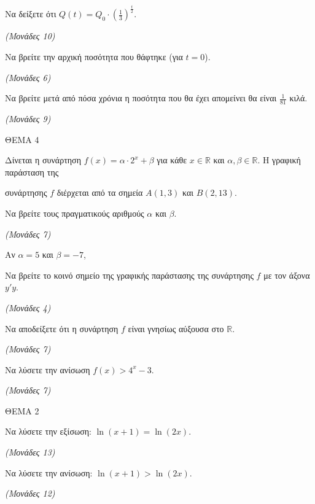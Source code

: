 \documentclass[11pt,a4paper,twoside]{book}
\newcommand{\monades}[1]{\hfill \textit{(Μονάδες #1)}}
\begin{document}
\begin{alist}
\item Να δείξετε ότι $Q(t) = Q_0 \cdot \left(\frac{1}{3}\right)^{\frac{t}{2}}$.

\monades{10}

\item Να βρείτε την αρχική ποσότητα που θάφτηκε (για $t=0$).

\monades{6}

\item Να βρείτε μετά από πόσα χρόνια η ποσότητα που θα έχει απομείνει θα είναι $\frac{1}{81}$ κιλά.

\monades{9}
\end{alist}

\vspace{4mm}

ΘΕΜΑ 4

Δίνεται η συνάρτηση $f(x) = \alpha \cdot 2^x + \beta$ για κάθε $x \in \mathbb{R}$ και $\alpha, \beta \in \mathbb{R}$. Η γραφική παράσταση της

συνάρτησης $f$ διέρχεται από τα σημεία $A(1, 3)$ και $B(2, 13)$.

\begin{alist}
\item Να βρείτε τους πραγματικούς αριθμούς $\alpha$ και $\beta$.

\monades{7}

Αν $\alpha = 5$ και $\beta = -7$,

\item Να βρείτε το κοινό σημείο της γραφικής παράστασης της συνάρτησης $f$ με τον άξονα $y'y$.

\monades{4}

\item Να αποδείξετε ότι η συνάρτηση $f$ είναι γνησίως αύξουσα στο $\mathbb{R}$.

\monades{7}

\item Να λύσετε την ανίσωση $f(x) > 4^x - 3$.

\monades{7}
\end{alist}

\vspace{4mm}

ΘΕΜΑ 2

\begin{alist}
\item Να λύσετε την εξίσωση: $\ln(x + 1) = \ln(2x)$.

\monades{13}

\item Να λύσετε την ανίσωση: $\ln(x + 1) > \ln(2x)$.

\monades{12}
\end{alist}
\end{document}
